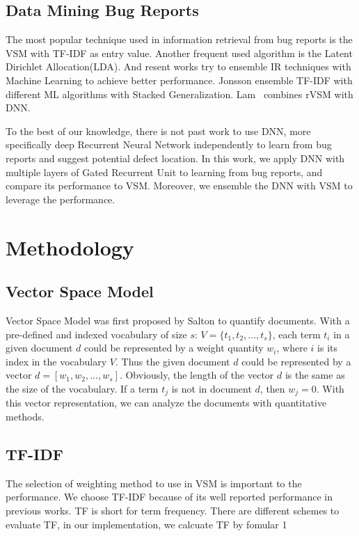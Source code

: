 \subsection{Data Mining Bug Reports}
The most popular technique used in information retrieval from bug reports is the VSM with TF-IDF as entry value\cite{gay2009use}\cite{zhou2012should}. 
Another frequent used algorithm is the Latent Dirichlet Allocation(LDA)\cite{nguyen2011topic}.
And resent works try to ensemble IR techniques with Machine Learning to achieve better performance\cite{jonsson2016automated}\cite{lam2017bug}.
Jonsson \etal \cite{jonsson2016automated} ensemble TF-IDF with different ML algorithms with Stacked Generalization. 
Lam \etal\ \cite{lam2017bug}combines rVSM with DNN.

To the best of our knowledge, there is not past work to use DNN, more specifically deep Recurrent Neural Network independently to learn from bug reports and suggest potential defect location.
In this work, we apply DNN with multiple layers of Gated Recurrent Unit to learning from bug reports, and compare its performance to VSM.
Moreover, we ensemble the DNN with VSM to leverage the performance.

\section{Methodology}

\subsection{Vector Space Model}
Vector Space Model was first proposed by Salton \etal\cite{salton1975vector} to quantify documents.
With a pre-defined and indexed vocabulary of size $s$: $V = \{t_1, t_2,...,t_s\}$, 
each term $t_i$ in a given document $d$ could be represented by a weight quantity $w_i$, where $i$ is its index in the vocabulary $V$.
Thus the given document $d$ could be represented by a vector $d=[w_1,w_2,...,w_s]$.
Obviously, the length of the vector $d$ is the same as the size of the vocabulary.
If a term $t_j$ is not in document $d$, then $w_j = 0$.   
With this vector representation, we can analyze the documents with quantitative methods.

\subsection{TF-IDF}
The selection of weighting method to use in VSM is important to the performance. 
We choose TF-IDF\cite{salton1988term} because of its well reported performance in previous works.
TF is short for term frequency. 
There are different schemes to evaluate TF, in our implementation, we calcuate TF by fomular 1

